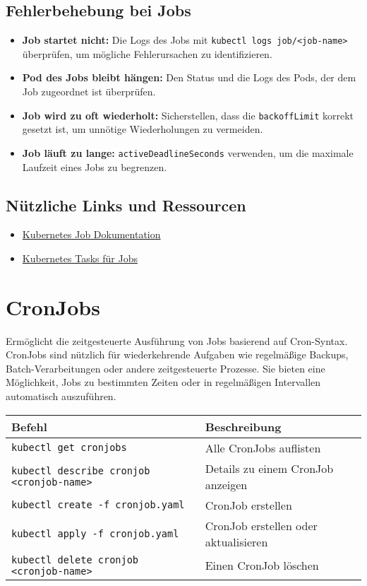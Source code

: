 \subsection{Fehlerbehebung bei Jobs}
\begin{itemize}
    \item \textbf{Job startet nicht:} Die Logs des Jobs mit \texttt{kubectl logs job/<job-name>} überprüfen, um mögliche Fehlerursachen zu identifizieren.
    \item \textbf{Pod des Jobs bleibt hängen:} Den Status und die Logs des Pods, der dem Job zugeordnet ist überprüfen.
    \item \textbf{Job wird zu oft wiederholt:} Sicherstellen, dass die \texttt{backoffLimit} korrekt gesetzt ist, um unnötige Wiederholungen zu vermeiden.
    \item \textbf{Job läuft zu lange:} \texttt{activeDeadlineSeconds} verwenden, um die maximale Laufzeit eines Jobs zu begrenzen.
\end{itemize}

\subsection{Nützliche Links und Ressourcen}
\begin{itemize}
    \item \href{https://kubernetes.io/docs/concepts/workloads/controllers/job/}{Kubernetes Job Dokumentation}
    \item \href{https://kubernetes.io/docs/tasks/job/}{Kubernetes Tasks für Jobs}
\end{itemize}



\section{CronJobs}
Ermöglicht die zeitgesteuerte Ausführung von Jobs basierend auf Cron-Syntax. CronJobs sind nützlich für wiederkehrende Aufgaben wie regelmäßige Backups, Batch-Verarbeitungen oder andere zeitgesteuerte Prozesse. Sie bieten eine Möglichkeit, Jobs zu bestimmten Zeiten oder in regelmäßigen Intervallen automatisch auszuführen.\\

\noindent
\begin{tabular}{|l|l|}
\hline
\textbf{Befehl} & \textbf{Beschreibung} \\
\hline
\texttt{kubectl get cronjobs} & Alle CronJobs auflisten \\
\texttt{kubectl describe cronjob <cronjob-name>} & Details zu einem CronJob anzeigen \\
\texttt{kubectl create -f cronjob.yaml} & CronJob erstellen\\
\texttt{kubectl apply -f cronjob.yaml} & CronJob erstellen oder aktualisieren\\
\texttt{kubectl delete cronjob <cronjob-name>} & Einen CronJob löschen \\
\hline
\end{tabular}
